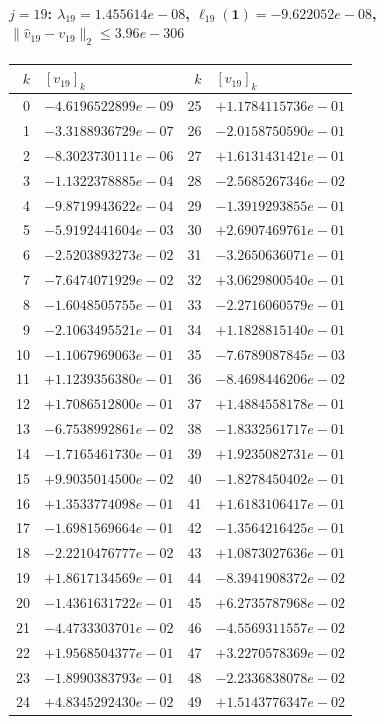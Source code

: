 \paragraph{$j = 19$: $\lambda_{19} = 1.455614e-08$, \quad $\ell_{19}(\mathbf{1}) = -9.622052e-08$, \quad $\|\hat{v}_{19} - v_{19}\|_2 \leq 3.96e-306$}
\begin{center}
{\footnotesize
\begin{tabular}{r@{\;\;}l@{\quad}r@{\;\;}l}
\toprule
$k$ & $[v_{19}]_k$ & $k$ & $[v_{19}]_k$ \\
\midrule
0 & $-4.6196522899e-09$ & 25 & $+1.1784115736e-01$ \\
1 & $-3.3188936729e-07$ & 26 & $-2.0158750590e-01$ \\
2 & $-8.3023730111e-06$ & 27 & $+1.6131431421e-01$ \\
3 & $-1.1322378885e-04$ & 28 & $-2.5685267346e-02$ \\
4 & $-9.8719943622e-04$ & 29 & $-1.3919293855e-01$ \\
5 & $-5.9192441604e-03$ & 30 & $+2.6907469761e-01$ \\
6 & $-2.5203893273e-02$ & 31 & $-3.2650636071e-01$ \\
7 & $-7.6474071929e-02$ & 32 & $+3.0629800540e-01$ \\
8 & $-1.6048505755e-01$ & 33 & $-2.2716060579e-01$ \\
9 & $-2.1063495521e-01$ & 34 & $+1.1828815140e-01$ \\
10 & $-1.1067969063e-01$ & 35 & $-7.6789087845e-03$ \\
11 & $+1.1239356380e-01$ & 36 & $-8.4698446206e-02$ \\
12 & $+1.7086512800e-01$ & 37 & $+1.4884558178e-01$ \\
13 & $-6.7538992861e-02$ & 38 & $-1.8332561717e-01$ \\
14 & $-1.7165461730e-01$ & 39 & $+1.9235082731e-01$ \\
15 & $+9.9035014500e-02$ & 40 & $-1.8278450402e-01$ \\
16 & $+1.3533774098e-01$ & 41 & $+1.6183106417e-01$ \\
17 & $-1.6981569664e-01$ & 42 & $-1.3564216425e-01$ \\
18 & $-2.2210476777e-02$ & 43 & $+1.0873027636e-01$ \\
19 & $+1.8617134569e-01$ & 44 & $-8.3941908372e-02$ \\
20 & $-1.4361631722e-01$ & 45 & $+6.2735787968e-02$ \\
21 & $-4.4733303701e-02$ & 46 & $-4.5569311557e-02$ \\
22 & $+1.9568504377e-01$ & 47 & $+3.2270578369e-02$ \\
23 & $-1.8990383793e-01$ & 48 & $-2.2336838078e-02$ \\
24 & $+4.8345292430e-02$ & 49 & $+1.5143776347e-02$ \\
\bottomrule
\end{tabular}
}
\end{center}

